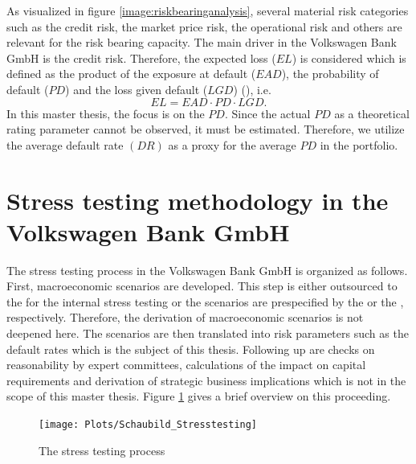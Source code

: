 \documentclass[a4paper, 12pt]{scrreprt}
\begin{document}
As visualized in figure \ref{image:riskbearinganalysis}, several material risk categories such as the credit risk, the market price risk, the operational risk and others are relevant for the risk bearing capacity. The main driver in the Volkswagen Bank GmbH is the credit risk. Therefore, the expected loss ($EL$) is considered which is defined as the product of the exposure at default ($EAD$), the probability of default ($PD$) and the loss given default ($LGD$) (\textcite[p. 188]{engelmann2011baselii}), i.e.
\begin{equation}\label{EL}
EL = EAD \cdot PD \cdot LGD.
\end{equation}
In this master thesis, the focus is on the $PD$. Since the actual $PD$ as a theoretical rating parameter cannot be observed, it must be estimated. Therefore, we utilize the average default rate $(DR)$ as a proxy for the average $PD$ in the portfolio.

\bigskip

\section{Stress testing methodology in the Volkswagen Bank GmbH}

The stress testing process in the Volkswagen Bank GmbH is organized as follows. First, macroeconomic scenarios are developed. This step is either outsourced to the \textcite{iwh2017scenario} for the internal stress testing or the scenarios are prespecified by the \textcite{eba2018stresstest} or the \textcite{ecb2018srep}, respectively. Therefore, the derivation of macroeconomic scenarios is not deepened here. 
The scenarios are then translated into risk parameters such as the default rates which is the subject of this thesis. Following up are checks on reasonability by expert committees, calculations of the impact on capital requirements and derivation of strategic business implications which is not in the scope of this master thesis. Figure \ref{image:stresstesting} gives a brief overview on this proceeding.

\begin{figure}[H]
	\centering
	\texttt{[image: Plots/Schaubild\_Stresstesting]}
	\caption{The stress testing process}
	\label{image:stresstesting}
\end{figure}
\end{document}
